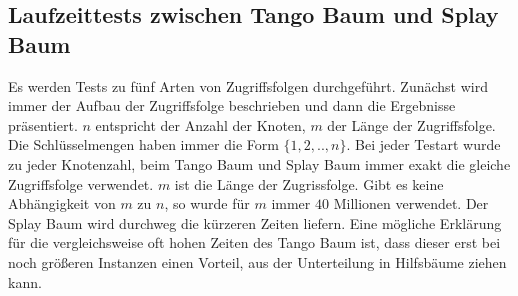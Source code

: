 \documentclass[a4paper,12pt]{article}
\begin{document}
\subsection {Laufzeittests zwischen Tango Baum und Splay Baum}






Es werden Tests zu fünf Arten von Zugriffsfolgen durchgeführt. Zunächst wird immer der Aufbau der Zugriffsfolge beschrieben und dann die Ergebnisse präsentiert. $n$ entspricht der Anzahl der Knoten, $m$ der Länge der Zugriffsfolge. Die Schlüsselmengen haben immer die Form $\{1,2,..,n\}$. Bei jeder Testart wurde zu jeder Knotenzahl, beim Tango Baum und Splay Baum immer exakt die gleiche Zugriffsfolge verwendet.  $m$ ist die Länge der Zugrissfolge. Gibt es keine Abhängigkeit von $m$ zu $n$, so wurde für $m$ immer $40$ Millionen verwendet. Der Splay Baum wird durchweg die kürzeren Zeiten liefern. Eine mögliche Erklärung für die vergleichsweise oft hohen Zeiten des Tango Baum ist, dass dieser erst bei noch größeren Instanzen einen Vorteil, aus der Unterteilung in Hilfsbäume ziehen kann.  
\end{document}
